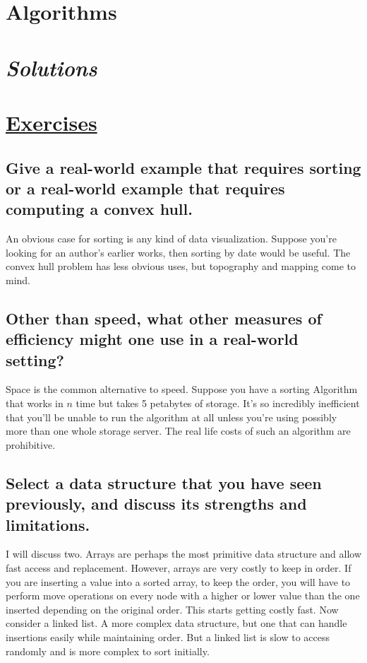 \section{Algorithms}
\section*{\textit{Solutions}}
\section*{\underline{Exercises}}
\subsection
{Give a real-world example that requires sorting or a real-world example that requires computing a convex hull.}
    An obvious case for sorting is any kind of data visualization. Suppose you're looking for an author's earlier 
    works, then sorting by date would be useful. The convex hull problem has less obvious uses, but topography and 
    mapping come to mind.
\subsection
{Other than speed, what other measures of efficiency might one use in a real-world
setting?}
    Space is the common alternative to speed. Suppose you have a sorting Algorithm that works in $n$ time but takes 5
    petabytes of storage. It's so incredibly inefficient that you'll be unable to run the algorithm at all unless 
    you're using possibly more than one whole storage server. The real life costs of such an algorithm are 
    prohibitive.
\subsection
{Select a data structure that you have seen previously, and discuss its strengths and
limitations.}
    I will discuss two. Arrays are perhaps the most primitive data structure and allow fast access and replacement.
    However, arrays are very costly to keep in order. If you are inserting a value into a sorted array, to keep the 
    order, you will have to perform move operations on every node with a higher or lower value than the one inserted
    depending on the original order. This starts getting costly fast. Now consider a linked list. A more complex data
    structure, but one that can handle insertions easily while maintaining order. But a linked list is slow to access
    randomly and is more complex to sort initially.
